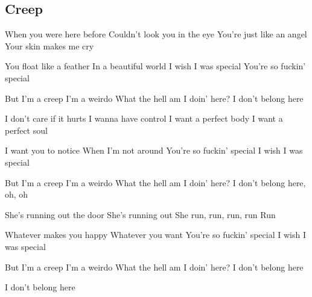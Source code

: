 \subsection*{Creep   }
\begin{guitar}
\begin{multicols}{2}

When you were here before
Couldn't look you in the eye
You're just like an angel
Your skin makes me cry

You float like a feather
In a beautiful world
I wish I was special
You're so fuckin' special

But I'm a creep
I'm a weirdo
What the hell am I doin' here?
I don't belong here

I don't care if it hurts
I wanna have control
I want a perfect body
I want a perfect soul

I want you to notice
When I'm not around
You're so fuckin' special
I wish I was special

But I'm a creep
I'm a weirdo
What the hell am I doin' here?
I don't belong here, oh, oh

She's running out the door
She's running out
She run, run, run, run
Run

Whatever makes you happy
Whatever you want
You're so fuckin' special
I wish I was special

But I'm a creep
I'm a weirdo
What the hell am I doin' here?
I don't belong here

I don't belong here
\end{multicols}
\end{guitar}

